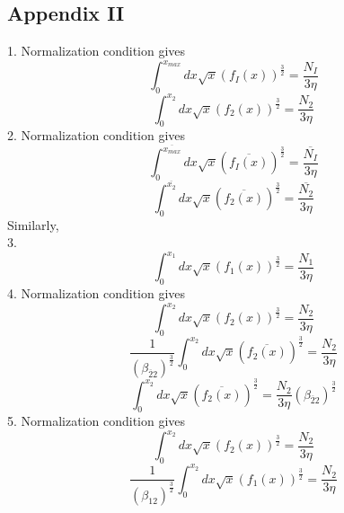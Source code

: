 \documentclass[fleqn, 10pt]{article}
\begin{document}
            \subsection{Appendix II}
1.    Normalization condition gives
    \begin{equation*}
      \int^{x_{max}}_0 dx \sqrt{x} (f_I(x))^\frac{3}{2} = \frac{N_I}{3\eta} 
      \label{33}
    \end{equation*}
    \begin{equation}
        \int^{x_{2}}_0 dx \sqrt{x} (f_{2}(x))^\frac{3}{2} = \frac{N_{2}}{3\eta}
    \end{equation}
2.    Normalization condition gives
    \begin{equation*}
      \int^{\overline{x_{max}}}_0 dx \sqrt{x} (\overline{f_I(x)})^\frac{3}{2} = \frac{\overline{N_I}}{3\eta} 
      \label{33}
    \end{equation*}
    \begin{equation}
        \int^{\overline{x_{2}}}_0 dx \sqrt{x} (\overline{f_{2}(x)})^\frac{3}{2} = \frac{\overline{N_{2}}}{3\eta}
    \end{equation}
   Similarly, \\
 3.   \begin{equation}
        \int^{x_1}_0 dx \sqrt{x} (f_{1}(x))^\frac{3}{2} = \frac{N_1}{3\eta}
    \end{equation}
   4. Normalization condition gives 
                \begin{equation*}
                \int^{x_{2}}_0 dx \sqrt{x} (f_{2}(x))^\frac{3}{2} = \frac{N_{2}}{3 \eta}    
                \end{equation*}
                \begin{equation*}
                    \frac{1}{(\beta_{\overline{2}2})^\frac{3}{2}}\int^{x_{2}}_0 dx \sqrt{x} (\overline{f_{2}(x)})^\frac{3}{2} = \frac{N_{2}}{3 \eta}
                \end{equation*}
                \begin{equation}
                   \int^{x_{2}}_0 dx \sqrt{x} (\overline{f_{2}(x)})^\frac{3}{2} = \frac{N_{2}}{3 \eta} (\beta_{\overline{2}2})^\frac{3}{2}
                   \label{79}
                \end{equation}
    5. Normalization condition gives 
 \begin{equation*}
     \int^{x_{2}}_0 dx \sqrt{x} (f_{2}(x))^\frac{3}{2} = \frac{N_{2}}{3 \eta} 
 \end{equation*}
 \begin{equation*}
     \frac{1}{(\beta_{12})^\frac{3}{2}} \int^{x_{2}}_0 dx \sqrt{x} (f_1(x))^\frac{3}{2} = \frac{N_{2}}{3 \eta}
 \end{equation*}
\end{document}
